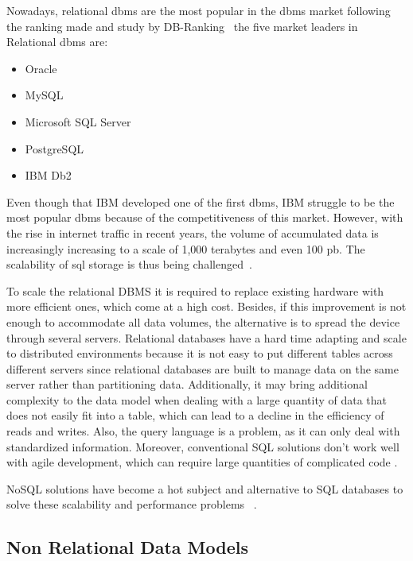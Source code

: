 Nowadays, relational \gls{dbms} are the most popular in the \gls{dbms} market following the ranking made and study by DB-Ranking~\cite{DBR} the five market leaders in Relational \gls{dbms} are:

\begin{itemize}
    \item Oracle
    \item MySQL
    \item Microsoft SQL Server
    \item PostgreSQL
    \item IBM Db2
\end{itemize}

Even though that IBM developed one of the first \gls{dbms}, IBM struggle to be the most popular \gls{dbms} because of the competitiveness of this market. However, with the rise in internet traffic in recent years, the volume of accumulated data is increasingly increasing to a scale of 1,000 terabytes and even 100 \gls{pb}. The scalability of \gls{sql} storage is thus being challenged~\cite{wuoverview}.

To scale the relational DBMS it is required to replace existing hardware with more efficient ones, which come at a high cost. Besides, if this improvement is not enough to accommodate all data volumes, the alternative is to spread the device through several servers.
Relational databases have a hard time adapting and scale to distributed environments because it is not easy to put different tables across different servers since relational databases are built to manage data on the same server rather than partitioning data.  Additionally, it may bring additional complexity to the data model when dealing with a large quantity of data that does not easily fit into a table, which can lead to a decline in the efficiency of reads and writes.  Also, the query language is a problem, as it can only deal with standardized information. Moreover, conventional SQL solutions don't work well with agile development, which can require large quantities of complicated code  \cite{han2011survey,wuoverview}.

 NoSQL solutions have become a hot subject and alternative to SQL databases to solve these scalability and performance problems ~\cite{han2011survey,wuoverview}.

\subsection{Non Relational Data Models}

